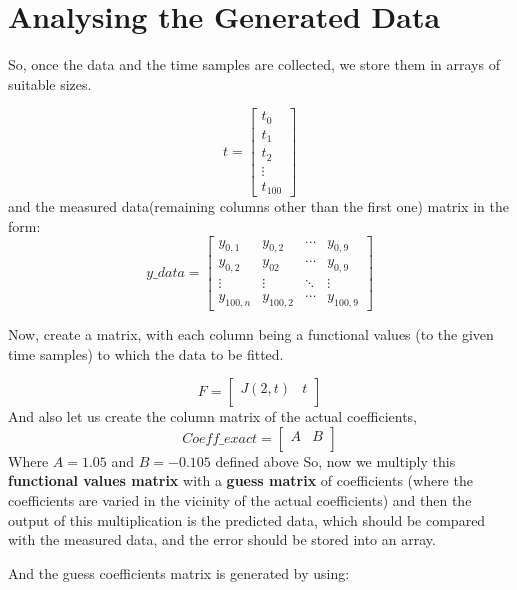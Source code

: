 \documentclass[10pt,english, openany]{book}
\begin{document}
\section{Analysing the Generated Data}
So, once the data and the time samples are collected, we store them in arrays of suitable sizes.\par
\begin{equation}
t=\begin{bmatrix} 
	t_0\\
    t_1\\
    t_2\\
    \vdots\\
    t_{100} \end{bmatrix}
    \end{equation}
    and the measured data(remaining columns other than the first one) matrix in the form:
   \begin{equation}
       y\_data=\begin{bmatrix} 
      	y_{0,1}&y_{0,2}&\cdots&y_{0,9}\\
   		y_{0,2}&y_{02}&\cdots&y_{0,9}\\
    	\vdots&\vdots &\ddots&\vdots\\
    	y_{100,n} &y_{100,2}&\cdots&y_{100,9}\end{bmatrix}
   \end{equation}   
   
 Now, create a matrix, with each column being a functional values (to the given time samples) to which the data to be fitted.\par
 \begin{equation}
F = 
 \begin{bmatrix}
 J(2, t) & t\\
 \end{bmatrix}
 \end{equation}
And also let us create the column matrix of the actual coefficients,
\begin{equation}
Coeff\_exact= 
 \begin{bmatrix}
 A&B\\
 \end{bmatrix}
 \end{equation}
 Where $A=1.05$ and $B=-0.105$ defined above
So, now we multiply this \textbf{functional values matrix} with a \textbf{guess matrix} of coefficients (where the coefficients are varied in the vicinity of the actual coefficients) and then the output of this multiplication is the predicted data, which should be compared with the measured data, and the error should be stored into an array.\par
And the guess coefficients matrix is generated by using:
\end{document}
